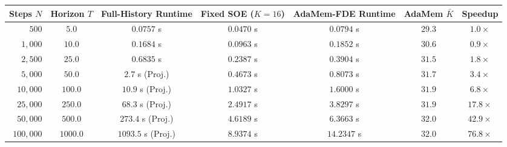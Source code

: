 \begin{tabular}{rcccccc}
\toprule
\textbf{Steps $N$} & \textbf{Horizon $T$} & \textbf{Full-History Runtime} & \textbf{Fixed SOE ($K\!=\!16$)} & \textbf{AdaMem-FDE Runtime} & \textbf{AdaMem $\bar{K}$} & \textbf{Speedup} \\
\midrule
$500$ & $5.0$ & $0.0757$ s & $0.0470$ s & $0.0794$ s & $29.3$ & $1.0\times$ \\
$1,000$ & $10.0$ & $0.1684$ s & $0.0963$ s & $0.1852$ s & $30.6$ & $0.9\times$ \\
$2,500$ & $25.0$ & $0.6835$ s & $0.2387$ s & $0.3904$ s & $31.5$ & $1.8\times$ \\
$5,000$ & $50.0$ & $2.7$ s (Proj.) & $0.4673$ s & $0.8073$ s & $31.7$ & $3.4\times$ \\
$10,000$ & $100.0$ & $10.9$ s (Proj.) & $1.0327$ s & $1.6000$ s & $31.9$ & $6.8\times$ \\
$25,000$ & $250.0$ & $68.3$ s (Proj.) & $2.4917$ s & $3.8297$ s & $31.9$ & $17.8\times$ \\
$50,000$ & $500.0$ & $273.4$ s (Proj.) & $4.6189$ s & $6.3663$ s & $32.0$ & $42.9\times$ \\
$100,000$ & $1000.0$ & $1093.5$ s (Proj.) & $8.9374$ s & $14.2347$ s & $32.0$ & $76.8\times$ \\
\bottomrule
\end{tabular}